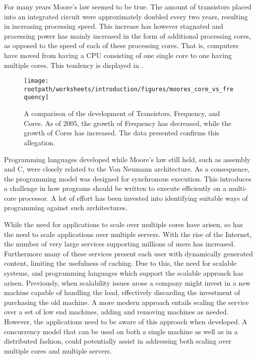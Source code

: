 \makeatletter {}\makeatother
{}
For many years Moore's law\cite{moore1965cramming} seemed to be true. The amount of transistors placed into an integrated circuit were approximately doubled every two years, resulting in increasing processing speed. This increase has however stagnated and processing power has mainly increased in the form of additional processing cores, as opposed to the speed of each of these processing cores\cite[p. 22]{sevenModels}. That is, computers have moved from having a \ac{CPU} consisting of one single core to one having multiple cores. This tendency is displayed in . 
\label{chap:introduction}

\begin{figure}[htbp]
\centering
 \texttt{[image: \\rootpath/worksheets/introduction/figures/moores\_core\_vs\_frequency]} 
 \caption{A comparison of the development of Transistors, Frequency, and Cores\cite{isca2009}. As of 2005, the growth of Frequency has decreased, while the growth of Cores has increased. The data presented confirms this allegation.}
\label{fig:moores_in_reality}
\end{figure}

Programming languages developed while Moore's law still held, such as assembly and C, were closely related to the Von Neumann architecture. As a consequence, the programming model was designed for synchronous execution. This introduces a challenge in how programs should be written to execute efficiently on a multi-core processor. A lot of effort has been invested into identifying suitable ways of programming against such architectures.

While the need for applications to scale over multiple cores have arisen, so has the need to scale applications over multiple servers. With the rise of the Internet, the number of very large services supporting millions of users has increased. Furthermore many of these services present each user with dynamically generated content, limiting the usefulness of caching. Due to this, the need for scalable systems, and programming languages which support the scalable approach has arisen. Previously, when scalability issues arose a company might invest in a new machine capable of handling the load, effectively discarding the investment of purchasing the old machine\cite[p. 2]{haller2007actors}. A more modern approach entails scaling the service over a set of low end machines, adding and removing machines as needed. However, the applications need to be aware of this approach when developed. A concurrency model that can be used on both a single machine as well as in a distributed fashion, could potentially assist in addressing both scaling over multiple cores and multiple servers.

